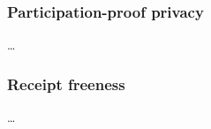 \subsubsection{Participation-proof privacy}

\begin{frame}
\begin{definition}
  \dots
\end{definition}
\end{frame}

\subsubsection{Receipt freeness}

\begin{frame}
\begin{definition}
  \dots
\end{definition}
\end{frame}

